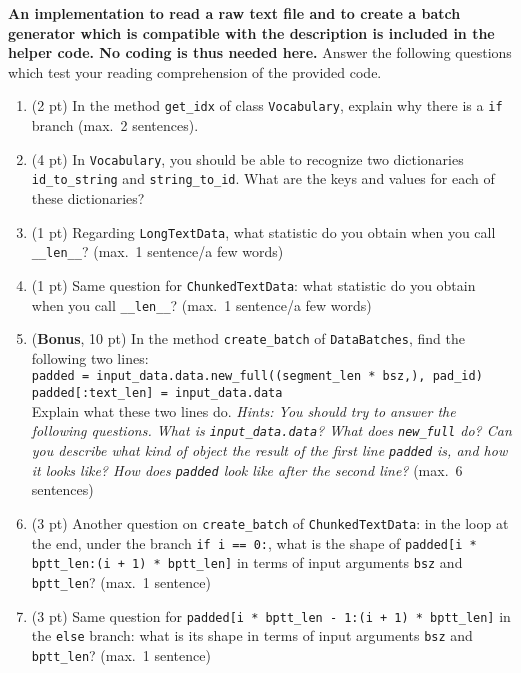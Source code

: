\documentclass[a4paper,11pt]{article}
\begin{document}
\textbf{An implementation to read a raw text file and to create a batch generator which is compatible with the description is included in the helper code. No coding is thus needed here.} Answer the following questions which test your reading comprehension of the provided code.
\begin{enumerate}
\item (2 pt) In the method \texttt{get\_idx} of class \texttt{Vocabulary}, explain why there is a \texttt{if} branch (max.~2 sentences).

\item (4 pt) In \texttt{Vocabulary}, you should be able to recognize two dictionaries \texttt{id\_to\_string} and \texttt{string\_to\_id}.
What are the keys and values for each of these dictionaries?

\item (1 pt) Regarding \texttt{LongTextData}, what statistic do you obtain when you call \texttt{\_\_len\_\_}? (max.~1 sentence/a few words)
\item (1 pt) Same question for \texttt{ChunkedTextData}: what statistic do you obtain when you call \texttt{\_\_len\_\_}? (max.~1 sentence/a few words)
\item (\textbf{Bonus}, 10 pt) In the method \texttt{create\_batch} of \texttt{DataBatches}, find the following two lines:\\
        \texttt{padded = input\_data.data.new\_full((segment\_len * bsz,), pad\_id)}\\
        \texttt{padded[:text\_len] = input\_data.data}\\
Explain what these two lines do.
\textit{Hints: You should try to answer the following questions. What is \texttt{input\_data.data}? What does \texttt{new\_full} do? Can you describe what kind of object the result of the first line \texttt{padded} is, and how it looks like?
How does \texttt{padded} look like after the second line?} (max.~6 sentences)
\item (3 pt) Another question on \texttt{create\_batch} of \texttt{ChunkedTextData}: in the loop at the end, under the branch \texttt{if i == 0:}, what is the shape of
\texttt{padded[i * bptt\_len:(i + 1) * bptt\_len]} in terms of input arguments \texttt{bsz} and \texttt{bptt\_len}? (max.~1 sentence)
\item (3 pt) Same question for
\texttt{padded[i * bptt\_len - 1:(i + 1) * bptt\_len]} in the \texttt{else} branch: what is its shape in terms of input arguments \texttt{bsz} and \texttt{bptt\_len}? (max.~1 sentence)
\end{enumerate}
\end{document}
